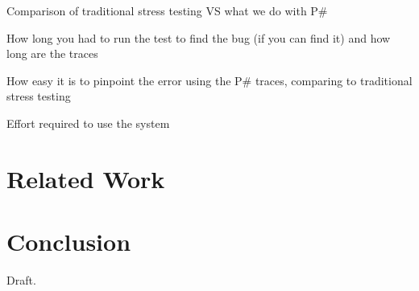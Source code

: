 \documentclass{sig-alternate}
\newcommand{\psharp}{P\#\xspace}
\begin{document}
Comparison of traditional stress testing VS what we do with \psharp

How long you had to run the test to find the bug (if you can find it) and how long are the traces

How easy it is to pinpoint the error using the \psharp traces, comparing to traditional stress testing

Effort required to use the system

\section{Related Work}
\label{sec:rw}



\section{Conclusion}
\label{sec:concl}

Draft.


%

%
%
\end{document}
